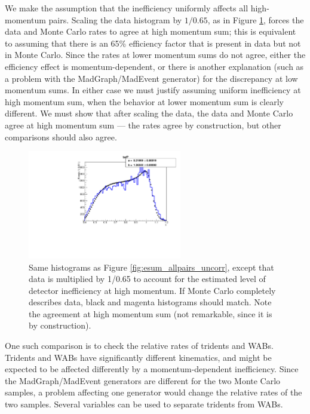 We make the assumption that the inefficiency uniformly affects all high-momentum pairs.
Scaling the data histogram by $1/0.65$, as in Figure \ref{fig:esum_allpairs}, forces the data and Monte Carlo rates to agree at high momentum sum; this is equivalent to assuming that there is an 65\% efficiency factor that is present in data but not in Monte Carlo.
Since the rates at lower momentum sums do not agree, either the efficiency effect is momentum-dependent, or there is another explanation (such as a problem with the MadGraph/MadEvent generator) for the discrepancy at low momentum sums.
In either case we must justify assuming uniform inefficiency at high momentum sum, when the behavior at lower momentum sum is clearly different.
We must show that after scaling the data, the data and Monte Carlo agree at high momentum sum --- the rates agree by construction, but other comparisons should also agree.

\begin{figure}[ht]
\begin{center}
    \includegraphics[width=0.6\textwidth,page=36,angle=-90]{recon/figs/wabratioplots}
\end{center}
    \caption{Same histograms as Figure \ref{fig:esum_allpairs_uncorr}, except that data is multiplied by 1/0.65 to account for the estimated level of detector inefficiency at high momentum.
    If Monte Carlo completely describes data, black and magenta histograms should match.
    Note the agreement at high momentum sum (not remarkable, since it is by construction).
    }
    \label{fig:esum_allpairs}
\end{figure}

One such comparison is to check the relative rates of tridents and WABs.
Tridents and WABs have significantly different kinematics, and might be expected to be affected differently by a momentum-dependent inefficiency.
Since the MadGraph/MadEvent generators are different for the two Monte Carlo samples, a problem affecting one generator would change the relative rates of the two samples.
Several variables can be used to separate tridents from WABs.

